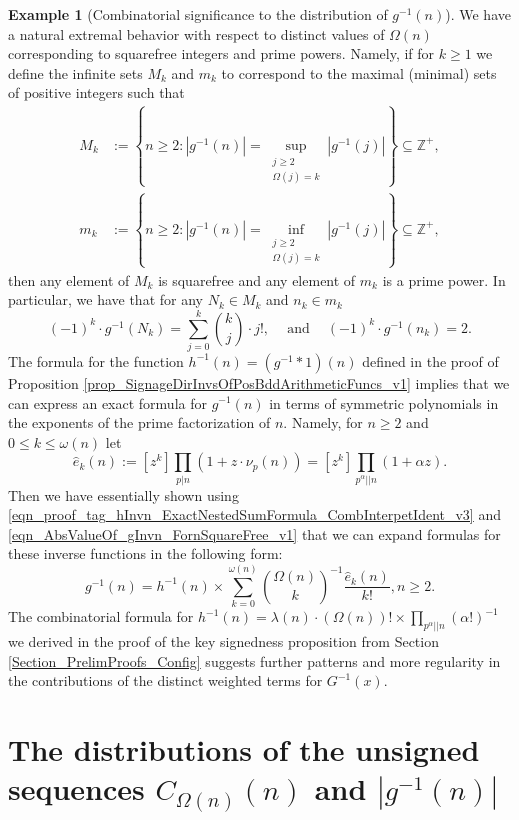 \documentclass[11pt,reqno,a4letter]{article}
\numberwithin{figure}{section}
\numberwithin{table}{section}
\theoremstyle{plain}
\numberwithin{theorem}{section}
\theoremstyle{definition}
\newtheorem{example}[theorem]{Example}
\begin{document}
\begin{example}[Combinatorial significance to the distribution of $g^{-1}(n)$] 
We have a natural extremal behavior with respect to distinct values of $\Omega(n)$ 
corresponding to squarefree integers and prime powers. Namely, if for $k \geq 1$ we define the 
infinite sets $M_k$ and $m_k$ to correspond to the maximal (minimal) sets of 
positive integers such that 
\begin{align*} 
M_k & := \left\{n \geq 2: |g^{-1}(n)| = \underset{{\substack{j \geq 2 \\ \Omega(j) = k}}}{\operatorname{sup}} 
     |g^{-1}(j)|\right\} \subseteq \mathbb{Z}^{+}, \\  
m_k & := \left\{n \geq 2: |g^{-1}(n)| = \underset{{\substack{j \geq 2 \\ \Omega(j) = k}}}{\operatorname{inf}} 
     |g^{-1}(j)|\right\} \subseteq \mathbb{Z}^{+}, 
\end{align*} 
then any element of $M_k$ is squarefree and any element of $m_k$ is a prime power. 
In particular, we have that for any $N_k \in M_k$ and $n_k \in m_k$
\[
(-1)^{k} \cdot g^{-1}(N_k) = \sum_{j=0}^{k} \binom{k}{j} \cdot j!, 
     \quad \mathrm{\ and\ } \quad 
     (-1)^{k} \cdot g^{-1}(n_k) = 2. 
\]
The formula for the function $h^{-1}(n) = (g^{-1} \ast 1)(n)$ defined in the proof of 
Proposition \ref{prop_SignageDirInvsOfPosBddArithmeticFuncs_v1} implies that we can express 
an exact formula for $g^{-1}(n)$ in terms of symmetric polynomials in the 
exponents of the prime factorization of $n$. 
Namely, for $n \geq 2$ and $0 \leq k \leq \omega(n)$ let 
\[
\widehat{e}_k(n) := [z^k] \prod_{p|n} (1 + z \cdot \nu_p(n)) = [z^k] \prod_{p^{\alpha} || n} (1 + \alpha z). 
\]
Then we have essentially shown using 
\eqref{eqn_proof_tag_hInvn_ExactNestedSumFormula_CombInterpetIdent_v3} and 
\eqref{eqn_AbsValueOf_gInvn_FornSquareFree_v1} that we can expand formulas for 
these inverse functions in the following form: 
\[
g^{-1}(n) = h^{-1}(n) \times \sum_{k=0}^{\omega(n)} \binom{\Omega(n)}{k}^{-1} 
     \frac{\widehat{e}_k(n)}{k!}, n \geq 2. 
\]
The combinatorial formula for 
$h^{-1}(n) = \lambda(n) \cdot (\Omega(n))! \times \prod_{p^{\alpha} || n} (\alpha !)^{-1}$ 
we derived in the proof of the key signedness proposition from 
Section \ref{Section_PrelimProofs_Config} 
suggests further patterns and more regularity in the contributions of the distinct weighted 
terms for $G^{-1}(x)$. 
\end{example} 

\newpage
\section{The distributions of the unsigned sequences 
         $C_{\Omega(n)}(n)$ and $|g^{-1}(n)|$} 
\label{Section_NewFormulasForgInvn} 
\end{document}

